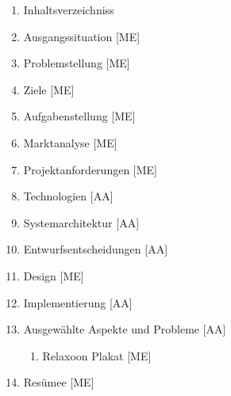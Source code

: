 \begin{enumerate}
    \item Inhaltsverzeichniss
    \item Ausgangssituation [ME]
    \item Problemstellung [ME]
    \item Ziele [ME]
    \item Aufgabenstellung [ME]
    \item Marktanalyse [ME]
    \item Projektanforderungen [ME]
    \item Technologien [AA]
    \item Systemarchitektur [AA]
    \item Entwurfsentscheidungen [AA]
    \item Design [ME]
    \item Implementierung [AA]
    \item Ausgewählte Aspekte und Probleme [AA]
          \begin{enumerate}
              \item Relaxoon Plakat [ME]
          \end{enumerate}
    \item Resümee [ME]
\end{enumerate}